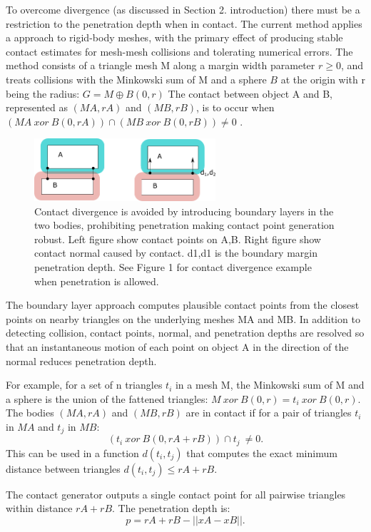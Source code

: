 \documentclass[times,12pt]{ACME2015article}
\begin{document}
To overcome divergence (as discussed in Section 2. introduction) there must be a restriction to the penetration depth when in contact. The current method applies a approach to rigid-body meshes, with the primary effect of producing stable contact estimates for mesh-mesh collisions and tolerating numerical errors. The method consists of a triangle mesh M along a margin width parameter $r \geq 0$, and treats collisions with the Minkowski sum of M and a sphere $B$ at the origin with r being the radius: $G=M \oplus B(0,r)$
The contact between object A and B, represented as $(MA, rA)$ and $(MB,rB)$, is to occur when $(MA \: xor \: B(0,rA)) \cap (MB \: xor \: B(0,rB)) \neq 0$ .

\begin{figure}[!h]
\centering
\includegraphics[width=0.6\textwidth]{contact1} \protect\caption{\label{fig6}Contact divergence is avoided by introducing boundary layers in the two bodies, prohibiting penetration making contact point generation robust. Left figure show contact points on A,B. Right figure show contact normal caused by contact. d1,d1 is the boundary margin penetration depth. See Figure 1 for contact divergence example when penetration is allowed.}
\end{figure} 

The boundary layer approach computes plausible contact points from the closest points on nearby triangles on the underlying meshes MA and MB. In addition to detecting collision, contact points, normal, and penetration depths are resolved so that an instantaneous motion of each point on object A in the direction of the normal reduces penetration depth.

For example, for a set of n triangles $t_i$ in a mesh M, the Minkowski sum of M and a sphere is the union of the fattened triangles: $M \: xor \: B(0, r) = t_i \:xor\: B(0, r)$. The bodies $(MA, rA)$ and $(MB, rB)$ are in contact if for a pair of triangles $t_i$ in $MA$ and $t_j$ in $MB$: 
$$(t_i \:xor\: B(0,rA +rB)) \cap t_j \: \neq 0.$$
This can be used in a function $d(t_i,t_j)$ that computes the exact minimum distance between triangles $d(t_i,t_j) \leq rA+rB$.

The contact generator outputs a single contact point for all pairwise triangles within distance $rA +rB$. The penetration depth is:
$$p = rA + rB - ||xA - xB||. $$
\end{document}
